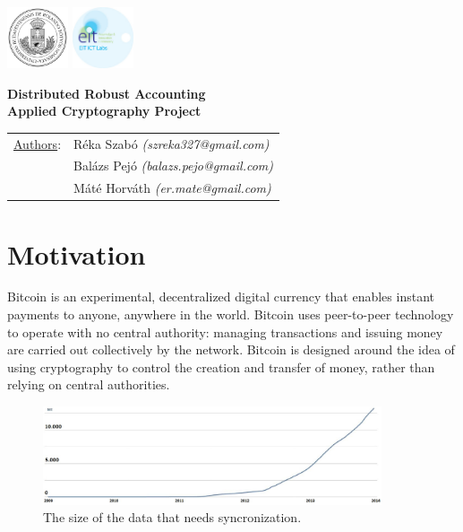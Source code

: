\documentclass[a4paper,12pt]{article}
\begin{document}
\pagestyle{fancy}
\begin{center}
\includegraphics[width=1.8cm]{elte.jpg}
\includegraphics[width=1.8cm]{eit.jpg}
\end{center}
\lfoot{}
\rfoot{}
\rhead{}
\lhead{}
\begin{center}
\LARGE{\textbf{Distributed Robust Accounting}}\\
\vspace{0.5cm}
\textbf{\large{Applied Cryptography Project}}\\
\vspace{0.5cm}
\end{center}
\begin{tabular}{p{2cm}l}
\underline{Authors}:&Réka Szabó \textit{(szreka327@gmail.com)}\\
&Balázs Pejó \textit{(balazs.pejo@gmail.com)}\\
&Máté Horváth \textit{(er.mate@gmail.com)}
\end{tabular}
\section{Motivation}
Bitcoin is an experimental, decentralized digital currency that enables instant payments to anyone, anywhere in the world. Bitcoin uses peer-to-peer technology to operate with no central authority: managing transactions and issuing money are carried out collectively by the network. Bitcoin is designed around the idea of using cryptography to control the creation and transfer of money, rather than relying on central authorities.

\begin{figure}[h]\label{size}
\begin{center}
\includegraphics[width=10cm]{blockchainsize.jpg}
\caption{The size of the data that needs syncronization.}
\end{center}
\end{figure}
\vspace{-0.5cm}
\end{document}
